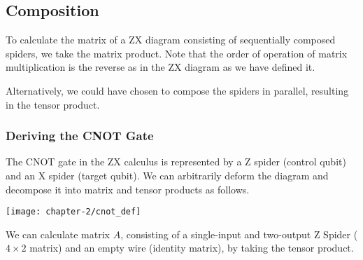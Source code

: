 
\subsection{Composition}
To calculate the matrix of a ZX diagram consisting of sequentially composed spiders, we take the matrix product. Note that the order of operation of matrix multiplication is the reverse as in the ZX diagram as we have defined it.


Alternatively, we could have chosen to compose the spiders in parallel, resulting in the tensor product.


\subsubsection{Deriving the CNOT Gate}
The CNOT gate in the ZX calculus is represented by a Z spider (control qubit) and an X spider (target qubit). We can arbitrarily deform the diagram and decompose it into matrix and tensor products as follows.

\begin{center}
    \texttt{[image: chapter-2/cnot\_def]}
\end{center}

We can calculate matrix $A$, consisting of a single-input and two-output Z Spider ($4 \times 2$ matrix) and an empty wire (identity matrix), by taking the tensor product.

